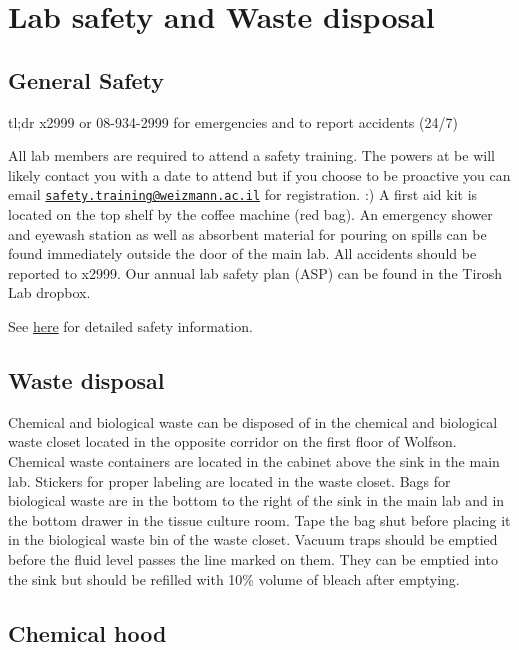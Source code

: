\documentclass[]{book}
\begin{document}
\chapter{Lab safety and Waste disposal}\label{safety}

\section{General Safety}\label{general-safety}

tl;dr x2999 or 08-934-2999 for emergencies and to report accidents
(24/7)

All lab members are required to attend a safety training. The powers at
be will likely contact you with a date to attend but if you choose to be
proactive you can email
\href{mailto:safety.training@weizmann.ac.il}{\nolinkurl{safety.training@weizmann.ac.il}}
for registration. :) A first aid kit is located on the top shelf by the
coffee machine (red bag). An emergency shower and eyewash station as
well as absorbent material for pouring on spills can be found
immediately outside the door of the main lab. All accidents should be
reported to x2999. Our annual lab safety plan (ASP) can be found in the
Tirosh Lab dropbox.

See
\href{https://www.weizmann.ac.il/safety/chemical-safety/general-guidelines}{here}
for detailed safety information.

\section{Waste disposal}\label{waste-disposal}

Chemical and biological waste can be disposed of in the chemical and
biological waste closet located in the opposite corridor on the first
floor of Wolfson. Chemical waste containers are located in the cabinet
above the sink in the main lab. Stickers for proper labeling are located
in the waste closet. Bags for biological waste are in the bottom to the
right of the sink in the main lab and in the bottom drawer in the tissue
culture room. Tape the bag shut before placing it in the biological
waste bin of the waste closet. Vacuum traps should be emptied before the
fluid level passes the line marked on them. They can be emptied into the
sink but should be refilled with 10\% volume of bleach after emptying.

\section{Chemical hood}\label{chemical-hood}
\end{document}
